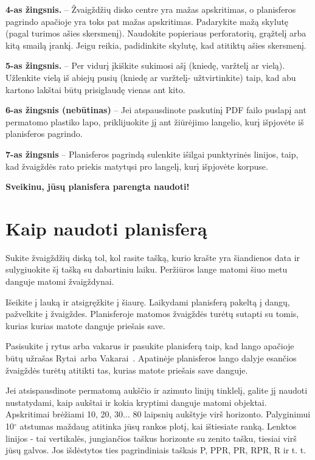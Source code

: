 \documentclass[a4paper,onecolumn,10pt]{article}
\begin{document}
{\bf 4-as žingsnis.} -- Žvaigždžių disko centre yra mažas apskritimas, o
planisferos pagrindo apačioje yra toks pat mažas apskritimas. Padarykite mažą skylutę
(pagal turimos ašies skersmenį). Naudokite popieriaus perforatorių, grąžtelį arba kitą smailą įrankį. Jeigu reikia, padidinkite skylutę, kad atitiktų ašies skersmenį.

{\bf 5-as žingsnis.} -- Per vidurį įkiškite sukimosi ašį (kniedę, varžtelį ar vielą). Užlenkite vielą iš abiejų pusių (kniedę ar varžtelį- užtvirtinkite) taip, kad abu kartono lakštai būtų prisiglaudę vienas ant kito.


{\bf 6-as žingsnis (nebūtinas)} -- Jei atspausdinote paskutinį PDF failo puslapį ant permatomo plastiko lapo, priklijuokite jį ant žiūrėjimo langelio, kurį išpjovėte iš planisferos pagrindo.


{\bf 7-as žingsnis} -- Planisferos pagrindą sulenkite išilgai punktyrinės linijos,
taip, kad žvaigždės rato priekis matytųsi pro langelį, kurį išpjovėte korpuse.


{\bf Sveikinu, jūsų planisfera parengta naudoti!}

\section*{Kaip naudoti planisferą}

Sukite žvaigždžių diską tol, kol rasite tašką, kurio krašte yra šiandienos data
ir sulygiuokite šį tašką su dabartiniu laiku. Peržiūros lange matomi šiuo metu danguje 
matomi žvaigždynai.

Išeikite į lauką ir atsigręžkite į šiaurę. Laikydami planisferą pakeltą į dangų, pažvelkite į
žvaigždes. Planisferoje matomos žvaigždės turėtų sutapti su tomis, kurias
kurias matote danguje priešais save.

Pasisukite į rytus arba vakarus ir pasukite planisferą taip, kad lango apačioje būtų užrašas \guillemotleft Rytai\guillemotright\ arba \guillemotleft Vakarai\guillemotright\ . Apatinėje planisferos lango dalyje esančios žvaigždės turėtų atitikti tas, kurias matote priešais save danguje.

Jei atsispausdinote permatomą aukščio ir azimuto linijų tinklelį, galite jį naudoti nustatydami, kaip aukštai ir kokia kryptimi danguje matomi objektai. Apskritimai brėžiami 10, 20, 30... 80 laipsnių aukštyje virš horizonto. Palyginimui 10$^\circ$ atstumas maždaug atitinka jūsų rankos plotį, kai ištiesiate ranką. Lenktos linijos - tai vertikalės, jungiančios taškus horizonte su zenito tašku, tiesiai virš jūsų galvos. Jos išdėstytos ties pagrindiniais taškais P, PPR, PR, RPR, R ir t. t.
\end{document}

